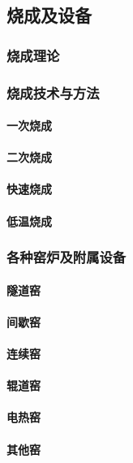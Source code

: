 \documentclass[UTF8]{../../ApplicationUniverse}
\begin{document}
    \subsection{烧成及设备}
        \subsubsection{烧成理论}
        \subsubsection{烧成技术与方法}
            \paragraph{一次烧成}
            \paragraph{二次烧成}
            \paragraph{快速烧成}
            \paragraph{低温烧成}
        \subsubsection{各种窑炉及附属设备}
            \paragraph{隧道窑}
            \paragraph{间歇窑}
            \paragraph{连续窑}
            \paragraph{辊道窑}
            \paragraph{电热窑}
            \paragraph{其他窑}
\end{document}

